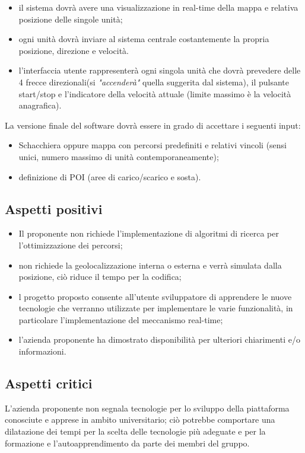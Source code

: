 \begin{itemize}
\item il sistema dovrà avere una visualizzazione in real-time della mappa e relativa posizione delle singole unità;
\item ogni unità dovrà inviare al sistema centrale costantemente la propria posizione, direzione e velocità.
\item l'interfaccia utente rappresenterà ogni singola unità che dovrà prevedere delle 4 frecce direzionali(si \textit{"accenderà"} quella suggerita dal sistema), il pulsante start/stop e l'indicatore della velocità attuale (limite massimo è  la velocità anagrafica).
\end{itemize}

La versione finale del software dovrà essere in grado di accettare i seguenti input:
\begin{itemize}
\item Schacchiera oppure mappa con percorsi predefiniti e relativi vincoli (sensi unici, numero massimo di unità contemporaneamente);
\item definizione di POI (aree di carico/scarico e sosta).
\end{itemize}


\subsection{Aspetti positivi}
\begin{itemize}
\item Il proponente non richiede l'implementazione di algoritmi di ricerca per l'ottimizzazione dei percorsi;
\item non richiede la geolocalizzazione interna o esterna e verrà simulata dalla posizione, ciò riduce il tempo per la  codifica;
\item l progetto proposto consente all'utente sviluppatore di apprendere le nuove tecnologie che verranno utilizzate per implementare le varie funzionalità, in particolare l'implementazione del meccanismo real-time;
\item l'azienda proponente ha dimostrato disponibilità per ulteriori chiarimenti e/o  informazioni.
\end{itemize}



\subsection{Aspetti critici}
L'azienda proponente non segnala tecnologie per lo sviluppo della piattaforma conosciute e apprese in ambito universitario; ciò potrebbe comportare una dilatazione dei tempi per la scelta delle tecnologie più adeguate e per la formazione e l'autoapprendimento da parte dei membri del gruppo.


